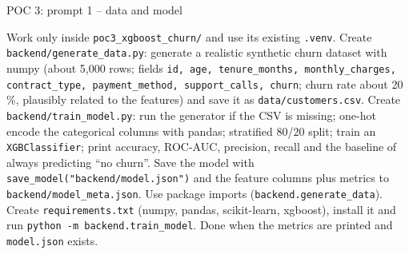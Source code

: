 \documentclass[aspectratio=169,11pt]{beamer}
\begin{document}
\begin{frame}{POC 3: prompt 1 -- data and model}
  \vspace{2pt}
  \begin{promptbox}
    Work only inside \texttt{poc3\_xgboost\_churn/} and use its existing \texttt{.venv}. Create \texttt{backend/generate\_data.py}: generate a realistic synthetic churn dataset with numpy (about 5,000 rows; fields \texttt{id, age, tenure\_months, monthly\_charges, contract\_type, payment\_method, support\_calls, churn}; churn rate about 20\,\%, plausibly related to the features) and save it as \texttt{data/customers.csv}.
    Create \texttt{backend/train\_model.py}: run the generator if the CSV is missing; one-hot encode the categorical columns with pandas; stratified 80/20 split; train an \texttt{XGBClassifier}; print accuracy, ROC-AUC, precision, recall and the baseline of always predicting ``no churn''.
    Save the model with \texttt{save\_model("backend/model.json")} and the feature columns plus metrics to \texttt{backend/model\_meta.json}. Use package imports (\texttt{backend.generate\_data}). Create \texttt{requirements.txt} (numpy, pandas, scikit-learn, xgboost), install it and run \mbox{\texttt{python -m backend.train\_model}}. Done when the metrics are printed and \texttt{model.json} exists.
  \end{promptbox}
\end{frame}
\end{document}

